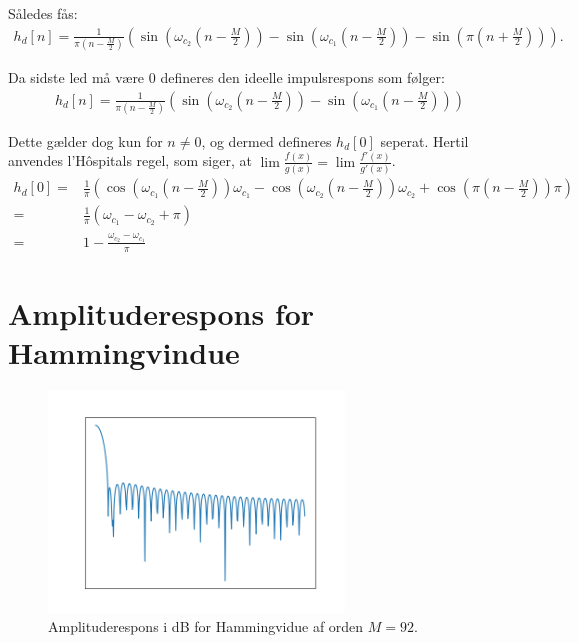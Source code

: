Således fås:
\begin{align*}
h_d[n]= \frac{1}{\pi \left(n-\frac{M}{2}\right)} \left(\sin\left(\omega_{c_2} \left(n-\frac{M}{2}\right)\right) - \sin\left(\omega_{c_1} \left(n-\frac{M}{2}\right)\right) - \sin\left( \pi\left( n + \frac{M}{2} \right) \right) \right).
\end{align*}

Da sidste led må være $0$ defineres den ideelle impulsrespons som følger:
\begin{align*}
h_d[n]= \frac{1}{\pi \left(n-\frac{M}{2}\right)} \left(\sin\left(\omega_{c_2} \left(n-\frac{M}{2}\right)\right) - \sin\left(\omega_{c_1} \left(n-\frac{M}{2}\right)\right)\right)
\end{align*}

Dette gælder dog kun for $n \neq 0$, og dermed defineres $h_d[0]$ seperat. Hertil anvendes l'Hôspitals regel, som siger, at $\lim \frac{f(x)}{g(x)}=\lim \frac{f'(x)}{g'(x)}$.
\begin{align*}
h_d[0]=& \frac{1}{\pi} \left( \cos\left( \omega_{c_1} \left(n-\frac{M}{2}\right) \right)\omega_{c_1} - \cos\left( \omega_{c_2} \left(n-\frac{M}{2}\right) \right)\omega_{c_2} +  \cos\left(\pi \left( n- \frac{M}{2}\right) \right) \pi \right) \\
=& \frac{1}{\pi}\left( \omega_{c_1} - \omega_{c_2} + \pi \right) \\
=& 1 - \frac{\omega_{c_2}-\omega_{c_1}}{\pi}
\end{align*}

\section{Amplituderespons for Hammingvindue} \label{app2}
\begin{figure}[H]
\centering
\includegraphics[width=0.7\textwidth]{figures/amplituderespons.png}
\caption{Amplituderespons i dB for Hammingvidue af orden $M=92$.}
\label{fig:amplituderespons}
\end{figure}